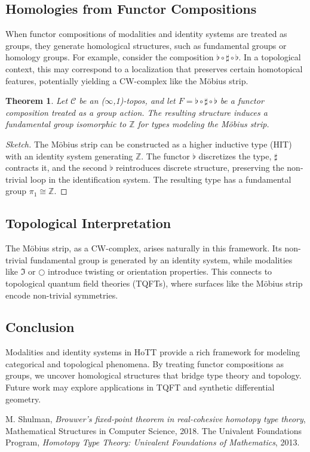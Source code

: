 \documentclass[12pt]{article}
\theoremstyle{definition}
\theoremstyle{plain}
\newtheorem{theorem}{Theorem}
\begin{document}
\subsection{Homologies from Functor Compositions}

When functor compositions of modalities and identity systems are treated as groups, they generate homological structures, such as fundamental groups or homology groups. For example, consider the composition $\flat \circ \sharp \circ \flat$. In a topological context, this may correspond to a localization that preserves certain homotopical features, potentially yielding a CW-complex like the Möbius strip.

\begin{theorem}
Let $\mathcal{C}$ be an ($\infty$,1)-topos, and let $F = \flat \circ \sharp \circ \flat$ be a functor composition treated as a group action. The resulting structure induces a fundamental group isomorphic to $\mathbb{Z}$ for types modeling the Möbius strip.
\end{theorem}

\begin{proof}[Sketch]
The Möbius strip can be constructed as a higher inductive type (HIT) with an identity system generating $\mathbb{Z}$. The functor $\flat$ discretizes the type, $\sharp$ contracts it, and the second $\flat$ reintroduces discrete structure, preserving the non-trivial loop in the identification system. The resulting type has a fundamental group $\pi_1 \cong \mathbb{Z}$.
\end{proof}

\subsection{Topological Interpretation}

The Möbius strip, as a CW-complex, arises naturally in this framework. Its non-trivial fundamental group is generated by an identity system, while modalities like $\Im$ or $\bigcirc$ introduce twisting or orientation properties. This connects to topological quantum field theories (TQFTs), where surfaces like the Möbius strip encode non-trivial symmetries.

\subsection{Conclusion}

Modalities and identity systems in HoTT provide a rich framework for modeling categorical and topological phenomena. By treating functor compositions as groups, we uncover homological structures that bridge type theory and topology. Future work may explore applications in TQFT and synthetic differential geometry.

\begin{thebibliography}{9}
M. Shulman, \emph{Brouwer’s fixed-point theorem in real-cohesive homotopy type theory}, Mathematical Structures in Computer Science, 2018.
The Univalent Foundations Program, \emph{Homotopy Type Theory: Univalent Foundations of Mathematics}, 2013.
\end{thebibliography}
\end{document}
